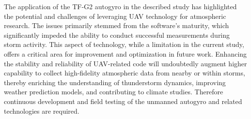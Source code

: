 The application of the TF-G2 autogyro in the described study has highlighted the potential and challenges of leveraging UAV technology for atmospheric research. The issues primarily stemmed from the software's maturity, which significantly impeded the ability to conduct successful measurements during storm activity. This aspect of technology, while a limitation in the current study, offers a critical area for improvement and optimization in future work. Enhancing the stability and reliability of UAV-related code will undoubtedly augment higher capability to collect high-fidelity atmospheric data from nearby or within storms, thereby enriching the understanding of thunderstorm dynamics, improving weather prediction models, and contributing to climate studies. Therefore continuous development and field testing of the unmanned autogyro and related technologies are required.



